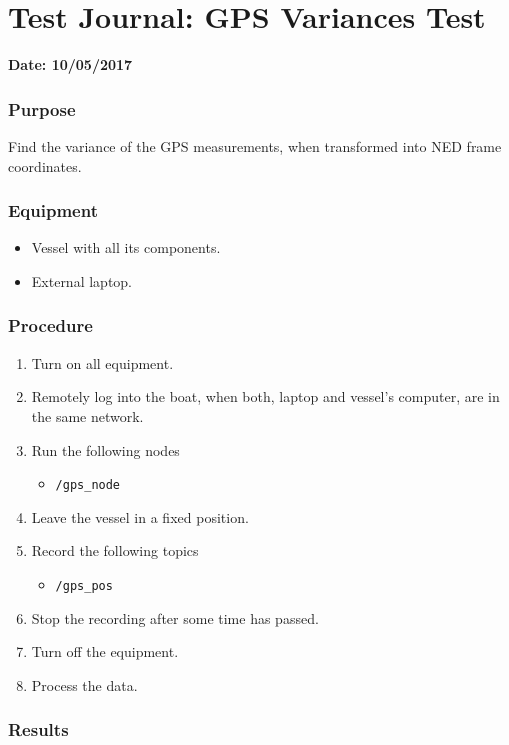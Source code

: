 \chapter{Test Journal: GPS Variances Test} \label{app:GPSVariances}

\textbf{Date: 10/05/2017}

\subsection*{Purpose}
Find the variance of the GPS measurements, when transformed into NED frame coordinates.

\subsection*{Equipment}
\begin{itemize}
    \item Vessel with all its components. 
    \item External laptop.
\end{itemize}

\subsection*{Procedure}
\begin{enumerate}
    \item Turn on all equipment.
    \item Remotely log into the boat, when both, laptop and vessel's computer, are in the same network.
    \item Run the following nodes
    \begin{itemize}
        \item \lstinline[style=cinline]{/gps_node}
    \end{itemize}
    \item Leave the vessel in a fixed position.
    \item Record the following topics
    \begin{itemize}
        \item \lstinline[style=cinline]{/gps_pos}      
    \end{itemize}
    \item Stop the recording after some time has passed.
    \item Turn off the equipment.
    \item Process the data.
\end{enumerate}

\subsection*{Results}
